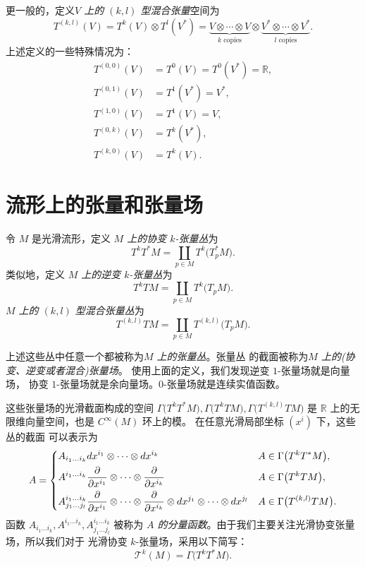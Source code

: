 \documentclass[fontset=none]{Notes}
\begin{document}
更一般的，定义\emph{$V$ 上的 $(k,l)$ 型混合张量}空间为
\[
  T^{(k,l)}(V)=T^k(V)\otimes T^l(V^*)=\underbrace{V\otimes\cdots\otimes V}_{\text{$k$ copies}}  
  \otimes \underbrace{V^*\otimes\cdots\otimes V^*}_{\text{$l$ copies}}.
\]
上述定义的一些特殊情况为：
\begin{align*}
  T^{(0,0)}(V)&=T^0(V)=T^0(V^*)=\mathbb{R},\\
  T^{(0,1)}(V)&=T^1(V^*)=V^*,\\
  T^{(1,0)}(V)&=T^1(V)=V,\\
  T^{(0,k)}(V)&=T^k(V^*),\\
  T^{(k,0)}(V)&=T^k(V).
\end{align*}




\section{流形上的张量和张量场}

令 $M$ 是光滑流形，定义 \emph{$M$ 上的协变 $k$-张量丛}为
\[
  T^kT^*M=\coprod_{p\in M}T^k\bigl(T_p^*M\bigr).  
\] 
类似地，定义 \emph{$M$ 上的逆变 $k$-张量丛}为
\[
  T^kTM=\coprod_{p\in M}T^k\bigl(T_pM\bigr)  .
\]
\emph{$M$ 上的 $(k,l)$ 型混合张量丛}为
\[
  T^{(k,l)}TM=\coprod_{p\in M}  T^{(k,l)}\bigl(T_pM\bigr).
\]

上述这些丛中任意一个都被称为\emph{$M$ 上的张量丛}。张量丛
的截面被称为\emph{$M$ 上的(协变、逆变或者混合)张量场}。
使用上面的定义，我们发现逆变 $1$-张量场就是向量场，
协变 $1$-张量场就是余向量场。$0$-张量场就是连续实值函数。

这些张量场的光滑截面构成的空间 
$\Gamma\bigl(T^kT^*M\bigr),\Gamma\bigl(T^kTM\bigr),\Gamma\bigl(T^{(k,l)}TM\bigr)$
是 $\mathbb{R}$ 上的无限维向量空间，也是 $C^\infty(M)$ 环上的模。
在任意光滑局部坐标 $\left(x^i\right)$ 下，这些丛的截面
可以表示为
\[
  A=\begin{dcases}
    A_{i_1\dots i_k}dx^{i_1}\otimes\cdots\otimes dx^{i_k} & A\in \Gamma\bigl(T^kT^*M\bigr),\\
    A^{i_1\dots i_k}\frac{\partial}{\partial x^{i_1}}\otimes
    \cdots\otimes \frac{\partial}{\partial x^{i_k}} & A\in \Gamma\bigl(T^kTM\bigr),\\
    A_{j_1\dots j_l}^{i_1\dots i_k}\frac{\partial}{\partial x^{i_1}}\otimes
    \cdots\otimes \frac{\partial}{\partial x^{i_k}}\otimes
    dx^{j_1}\otimes\cdots\otimes dx^{j_l} & A\in \Gamma\bigl(T^{(k,l)}TM\bigr).
  \end{dcases}  
\]
函数 $A_{i_1\dots i_k},A^{i_1\dots i_k},A_{j_1\dots j_l}^{i_1\dots i_k}$ 被称为
\emph{$A$ 的分量函数}。由于我们主要关注光滑协变张量场，所以我们对于
光滑协变 $k$-张量场，采用以下简写：
\[
  \mathcal{T}^k(M)=\Gamma\bigl(T^kT^*M\bigr)  .
\]
\end{document}
